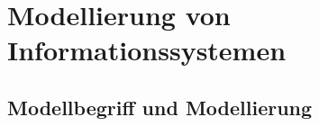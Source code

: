 \documentclass[12pt,a4paper]{article}
\begin{document}
\newpage 
\section{Modellierung von Informationssystemen}

\vspace{0.5cm}
\subsection{Modellbegriff und Modellierung} %
\end{document}
